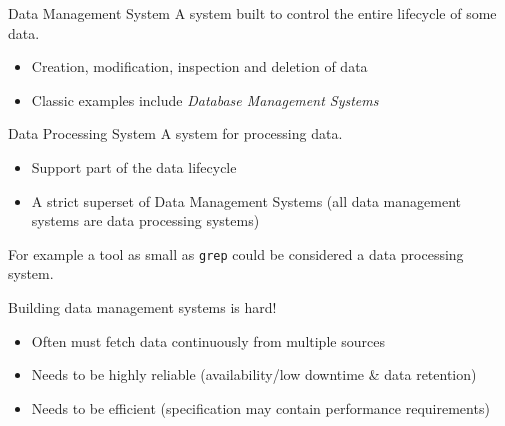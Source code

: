 \begin{tcbraster}[raster columns=2, raster equal height]
    \begin{definitionbox}{Data Management System}
        A system built to control the entire lifecycle of some data.
        \begin{itemize}
            \item Creation, modification, inspection and deletion of data
            \item Classic examples include \textit{Database Management Systems}
        \end{itemize}
    \end{definitionbox}
    \begin{definitionbox}{Data Processing System}
        A system for processing data.
        \begin{itemize}
            \item Support part of the data lifecycle
            \item A strict superset of Data Management Systems (all data management systems are data processing systems)
        \end{itemize}
        For example a tool as small as \texttt{grep} could be considered a data processing system.
    \end{definitionbox}
\end{tcbraster}
\noindent
Building data management systems is hard!
\begin{itemize}
    \item Often must fetch data continuously from multiple sources
    \item Needs to be highly reliable (availability/low downtime \& data retention)
    \item Needs to be efficient (specification may contain performance requirements)
\end{itemize}
